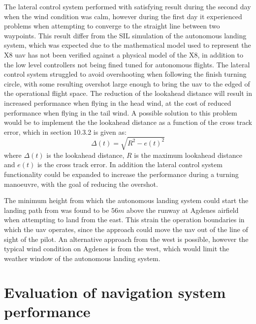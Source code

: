The lateral control system performed with satisfying result during the second day when the wind condition was calm, however during the first day it experienced problems when attempting to converge to the straight line between two waypoints. This result differ from the SIL simulation of the autonomous landing system, which was expected due to the mathematical model used to represent the X8 \gls{uav} has not been verified against a physical model of the X8, in addition to the low level controllers not being fined tuned for autonomous flights. The lateral control system  struggled to avoid overshooting when following the finish turning circle, with some resulting overshot large enough to bring the \gls{uav} to the edged of the operational flight space. 
The reduction of the lookahead distance will result in increased performance when flying in the head wind, at the cost of reduced performance when flying in the tail wind. A possible solution to this problem would be to implement the the lookahead distance as a function of the cross track error, which in \citep{fossen2011handbook} section 10.3.2 is given as:
\begin{equation}
\Delta(t) = \sqrt{R^2 - e(t)^2}
\end{equation}
where $\Delta(t)$ is the lookahead distance, $R$ is the maximum lookahead distance and $e(t)$ is the cross track error. In addition the lateral control system functionality could be expanded to increase the performance during a turning manoeuvre, with the goal of reducing the overshot.

The minimum height from which the autonomous landing system could start the landing path from was found to be $56 m$ above the runway at Agdenes airfield when attempting to land from the east. This strain the operation boundaries in which the \gls{uav} operates, since the approach could move the \gls{uav} out of the line of sight of the pilot. An alternative approach from the west is possible, however the typical wind condition on Agdenes is from the west, which would limit the weather window of the autonomous landing system.
\section{Evaluation of navigation system performance}\label{ss:NavigationResults}
